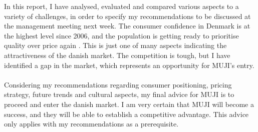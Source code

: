 In this report, I have analysed, evaluated and compared various aspects to a variety of challenges, in order to specify my recommendations to be discussed at the management meeting next week. The consumer confidence in Denmark is at the highest level since 2006, and the population is getting ready to prioritise quality over price again \cite{ConsumerLifestyles}. This is just one of many aspects indicating the attractiveness of the danish market. The competition is tough, but I have identified a gap in the market, which represents an opportunity for MUJI's entry.
\\\\
Considering my recommendations regarding consumer positioning, pricing strategy, future trends and cultural aspects, my final advice for MUJI is to proceed and enter the danish market. I am very certain that MUJI will become a success, and they will be able to establish a competitive advantage. This advice only applies with my recommendations as a prerequisite.